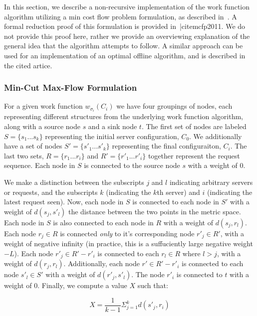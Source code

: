 In this section, we describe a non-recursive implementation of the work function algorithm utilizing a min cost flow problem formulation, as described in~\cite{mcfp2011}. A formal reduction proof of this formulation is provided in~|cite{mcfp2011}. We do not provide this proof here, rather we provide an overviewing explanation of the general idea that the algorithm attempts to follow. A similar approach can be used for an implementation of an optimal offline algorithm, and is described in the cited artice.

\subsubsection*{Min-Cut Max-Flow Formulation}
For a given work function $w_{\sigma_i}(C_i)$ we have four groupings of nodes, each representing different structures from the underlying work function algorithm, along with a source node $s$ and a sink node $t$. The first set of nodes are labeled $S = \{s_1 ... s_k\}$ representing the initial server configuration, $C_0$. We additionally have a set of nodes $S' = \{s'_1 ... s'_k\}$ representing the final configuraiton, $C_i$. The last two sets, $R = \{r_1 ... r_i\}$ and $R' = \{r'_1 ... r'_i\}$ together represent the request sequence. Each node in $S$ is connected to the source node $s$ with a weight of $0$.

We make a distinction between the subscripts $j$ and $l$ indicating arbitrary servers or requests, and the subscripts $k$ (indicating the $k$th server) and $i$ (indicating the latest request seen). Now, each node in $S$ is connected to each node in $S'$ with a weight of $d(s_j, s'_l)$ the distance between the two points in the metric space. Each node in $S$ is also connected to each node in $R$ with a weight of $d(s_j, r_l)$. Each node $r_j \in R$ is connected \textit{only} to it's corresponding node $r'_j\in R'$, with a weight of negative infinity (in practice, this is a suffuciently large negative weight $-L$). Each node $r'_j \in R' - r'_i$ is connected to each $r_l \in R$ where $l > j$, with a weight of $d(r_j, r_l)$. Additionally, each node $r' \in R'-r'_i$ is connected to each node $s'_l \in S'$ with a weight of $d(r'_j, s'_l)$. The node $r'_i$ is connected to $t$ with a weight of $0$. Finally, we compute a value $X$ such that:

\begin{equation*}
    X = \frac{1}{k-1} \Sigma_{j=1}^{k} d(s'_j, r_i)
\end{equation*}

